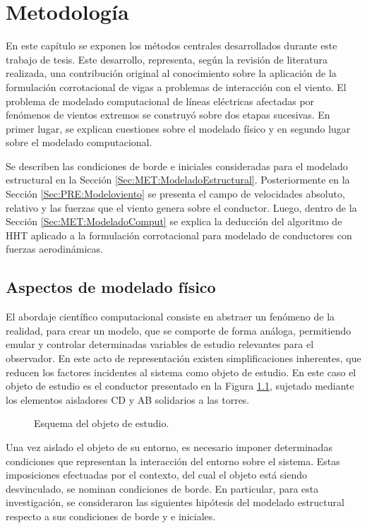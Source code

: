\chapter{Metodología}\label{Cap:Metodologia}
\linenumbers

En este capítulo se exponen los métodos centrales desarrollados durante este trabajo de tesis. Este desarrollo, representa, según la revisión de literatura realizada, una contribución original al conocimiento sobre la aplicación de la formulación corrotacional de vigas a problemas de interacción con el viento. El problema de modelado computacional de líneas eléctricas afectadas por fenómenos de vientos extremos se construyó sobre dos etapas sucesivas. En primer lugar, se explican cuestiones sobre el modelado físico y en segundo lugar sobre el modelado computacional.

Se describen las condiciones de borde e iniciales consideradas para el modelado estructural en la Sección \ref{Sec:MET:ModeladoEstructural}. Posteriormente en la Sección \ref{Sec:PRE:Modeloviento} se presenta el campo de velocidades absoluto, relativo y las fuerzas que el viento genera sobre el conductor. Luego, dentro de la Sección \ref{Sec:MET:ModeladoComput} se explica la deducción del algoritmo de HHT aplicado a la formulación corrotacional para modelado de conductores con fuerzas aerodinámicas.

\section{Aspectos de modelado físico}

El abordaje científico computacional consiste en abstraer un fenómeno de la realidad, para crear un modelo, que se comporte de forma análoga, permitiendo emular y controlar determinadas variables de estudio relevantes para el observador. En este acto de representación existen simplificaciones inherentes, que reducen los factores incidentes al sistema como objeto de estudio. En este caso el objeto de estudio es el conductor presentado en la Figura \ref{fig:MET:EsquemaCondiciones}, sujetado mediante los elementos aisladores CD y AB solidarios a las torres.

\begin{figure}[htbp]
	\centering
	\def\svgwidth{80mm}
	
	\caption{Esquema del objeto de estudio.}
	\label{fig:MET:EsquemaCondiciones}
\end{figure}

Una vez aislado el objeto de su entorno, es necesario imponer determinadas condiciones que representan la interacción del entorno sobre el sistema. Estas imposiciones efectuadas por el contexto, del cual el objeto está siendo desvinculado, se nominan condiciones de borde. En particular, para esta investigación, se consideraron las siguientes hipótesis del modelado estructural respecto a sus condiciones de borde y e iniciales.



